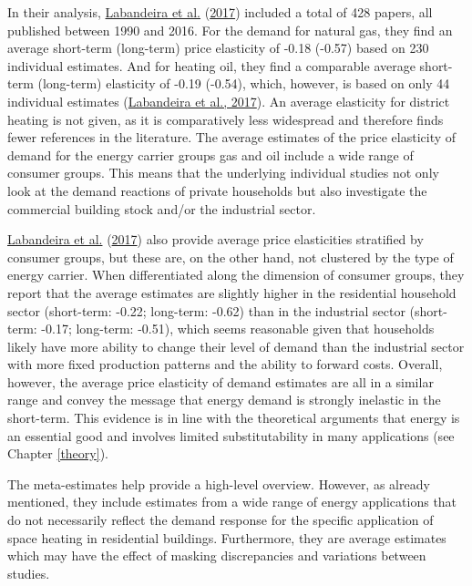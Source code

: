 \documentclass[12pt,twoside]{reedthesis}
\begin{document}
In their analysis, \protect\hyperlink{ref-labandeira_etal17}{Labandeira et al.} (\protect\hyperlink{ref-labandeira_etal17}{2017}) included a total of 428 papers, all published between 1990 and 2016. For the demand for natural gas, they find an average short-term (long-term) price elasticity of -0.18 (-0.57) based on 230 individual estimates. And for heating oil, they find a comparable average short-term (long-term) elasticity of -0.19 (-0.54), which, however, is based on only 44 individual estimates (\protect\hyperlink{ref-labandeira_etal17}{Labandeira et al., 2017}). An average elasticity for district heating is not given, as it is comparatively less widespread and therefore finds fewer references in the literature. The average estimates of the price elasticity of demand for the energy carrier groups gas and oil include a wide range of consumer groups. This means that the underlying individual studies not only look at the demand reactions of private households but also investigate the commercial building stock and/or the industrial sector.

\protect\hyperlink{ref-labandeira_etal17}{Labandeira et al.} (\protect\hyperlink{ref-labandeira_etal17}{2017}) also provide average price elasticities stratified by consumer groups, but these are, on the other hand, not clustered by the type of energy carrier. When differentiated along the dimension of consumer groups, they report that the average estimates are slightly higher in the residential household sector (short-term: -0.22; long-term: -0.62) than in the industrial sector (short-term: -0.17; long-term: -0.51), which seems reasonable given that households likely have more ability to change their level of demand than the industrial sector with more fixed production patterns and the ability to forward costs. Overall, however, the average price elasticity of demand estimates are all in a similar range and convey the message that energy demand is strongly inelastic in the short-term. This evidence is in line with the theoretical arguments that energy is an essential good and involves limited substitutability in many applications (see Chapter \ref{theory}).

The meta-estimates help provide a high-level overview. However, as already mentioned, they include estimates from a wide range of energy applications that do not necessarily reflect the demand response for the specific application of space heating in residential buildings. Furthermore, they are average estimates which may have the effect of masking discrepancies and variations between studies.
\end{document}
